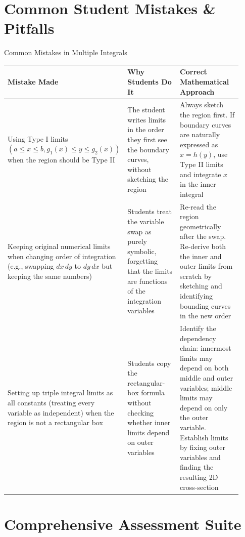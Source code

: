 \documentclass[12pt,a4paper]{article}
\begin{document}
\section{Common Student Mistakes \& Pitfalls}

\begin{mistakebox}{Common Mistakes in Multiple Integrals}
\begin{tabular}{@{}>{\raggedright}p{0.30\linewidth} >{\raggedright}p{0.30\linewidth} >{\raggedright\arraybackslash}p{0.32\linewidth}@{}}
\toprule
\textbf{Mistake Made} & \textbf{Why Students Do It} & \textbf{Correct Mathematical Approach} \\
\midrule
Using Type I limits \((a\le x\le b, g_1(x)\le y\le g_2(x))\) when the region should be Type II &
  The student writes limits in the order they first see the boundary curves, without sketching the region &
  Always sketch the region first. If boundary curves are naturally expressed as \(x=h(y)\), use Type II limits and integrate \(x\) in the inner integral \\[6pt]
Keeping original numerical limits when changing order of integration (e.g., swapping \(dx\,dy\) to \(dy\,dx\) but keeping the same numbers) &
  Students treat the variable swap as purely symbolic, forgetting that the limits are functions of the integration variables &
  Re-read the region geometrically after the swap. Re-derive both the inner and outer limits from scratch by sketching and identifying bounding curves in the new order \\[6pt]
Setting up triple integral limits as all constants (treating every variable as independent) when the region is not a rectangular box &
  Students copy the rectangular-box formula without checking whether inner limits depend on outer variables &
  Identify the dependency chain: innermost limits may depend on both middle and outer variables; middle limits may depend on only the outer variable. Establish limits by fixing outer variables and finding the resulting 2D cross-section \\
\bottomrule
\end{tabular}
\end{mistakebox}

\section{Comprehensive Assessment Suite}
\end{document}
